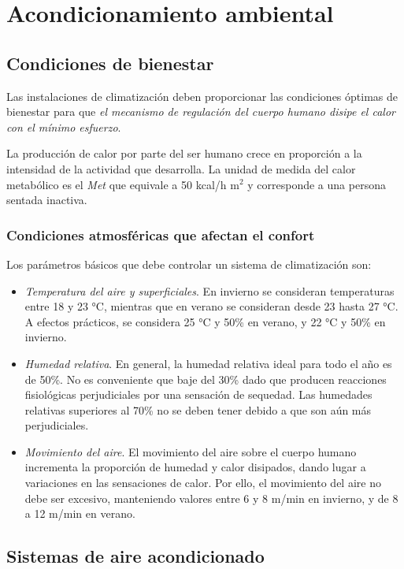 \chapter{Acondicionamiento ambiental}
\minitoc
\section{Condiciones de bienestar}
Las instalaciones de climatización deben proporcionar las condiciones óptimas de bienestar para que \emph{el mecanismo de regulación del cuerpo humano disipe el calor con el mínimo esfuerzo}.

La producción de calor por parte del ser humano crece en proporción a la intensidad de la actividad que desarrolla. La unidad de medida del calor metabólico es el \emph{Met} que equivale a 50 kcal/h m$^2$ y corresponde a una persona sentada inactiva.

\subsection{Condiciones atmosféricas que afectan el confort}

Los parámetros básicos que debe controlar un sistema de climatización son:
\begin{itemize}
	\item \emph{Temperatura del aire y superficiales}.
	En invierno se consideran temperaturas entre 18 y 23 °C, mientras que en verano se consideran desde 23 hasta 27 °C. A efectos prácticos, se considera 25 °C y 50\% en verano, y 22 °C y 50\% en invierno.
	\item \emph{Humedad relativa}. En general, la humedad relativa ideal para todo el año es de 50\%. No es conveniente que baje del 30\% dado que producen reacciones fisiológicas perjudiciales por una sensación de sequedad. Las humedades relativas superiores al 70\% no se deben tener debido a que son aún más perjudiciales.
	\item \emph{Movimiento del aire}. El movimiento del aire sobre el cuerpo humano incrementa la proporción de humedad y calor disipados, dando lugar a variaciones en las sensaciones de calor. Por ello, el movimiento del aire no debe ser excesivo, manteniendo valores entre 6 y 8 m/min en invierno, y de 8 a 12 m/min en verano.
\end{itemize}

\section{Sistemas de aire acondicionado}

